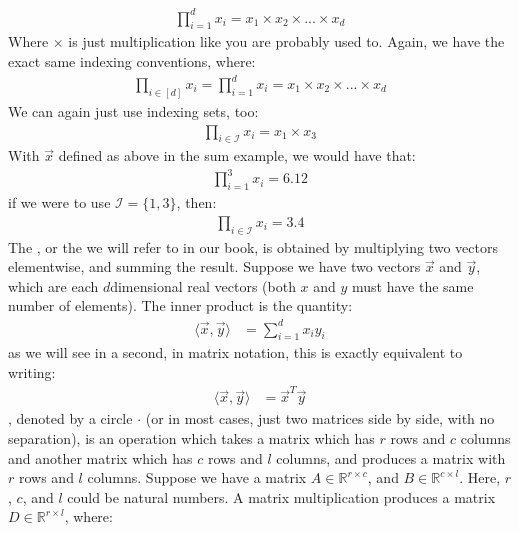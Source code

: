\documentclass[letterpaper,10pt,english]{jupyterBook}
\begin{document}
\begin{align*}
    \prod_{i = 1}^d x_i = x_1 \times x_2 \times ... \times x_d
\end{align*}
\sphinxAtStartPar
Where \(\times\) is just multiplication like you are probably used to. Again, we have the exact same indexing conventions, where:
\begin{align*}
    \prod_{i \in [d]} x_i=
    \prod_{i = 1}^d x_i = x_1 \times x_2 \times ... \times x_d
\end{align*}
\sphinxAtStartPar
We can again just use indexing sets, too:
\begin{align*}
    \prod_{i \in \mathcal I}x_i = x_1 \times x_3
\end{align*}
\sphinxAtStartPar
With \(\vec x\) defined as above in the sum example, we would have that:
\begin{align*}
   \prod_{i = 1}^3 x_i = 6.12
\end{align*}
\sphinxAtStartPar
if we were to use \(\mathcal I = \{1,3\}\), then:
\begin{align*}
    \prod_{i \in \mathcal I}x_i = 3.4
\end{align*}
\sphinxAtStartPar
The , or the  we will refer to in our book, is obtained by multiplying two vectors element\sphinxhyphen{}wise, and summing the result. Suppose we have two vectors \(\vec x\) and \(\vec y\), which are each \(d\)\sphinxhyphen{}dimensional real vectors (both \(x\) and \(y\) must have the same number of elements). The inner product is the quantity:
\begin{align*}
    \langle \vec x, \vec y\rangle &= \sum_{i = 1}^d x_i y_i
\end{align*}
\sphinxAtStartPar
as we will see in a second, in matrix notation, this is exactly equivalent to writing:
\begin{align*}
    \langle \vec x, \vec y\rangle &= \vec x^T \vec y
\end{align*}
\sphinxAtStartPar
{}, denoted by a circle \(\cdot\) (or in most cases, just two matrices side by side, with no separation), is an operation which takes a matrix which has \(r\) rows and \(c\) columns and another matrix which has \(c\) rows and \(l\) columns, and produces a matrix with \(r\) rows and \(l\) columns. Suppose we have a matrix \(A \in \mathbb R^{r \times c}\), and \(B \in \mathbb R^{c \times l}\). Here, \(r\), \(c\), and \(l\) could be  natural numbers. A matrix multiplication produces a matrix \(D \in \mathbb R^{r \times l}\), where:
\end{document}
